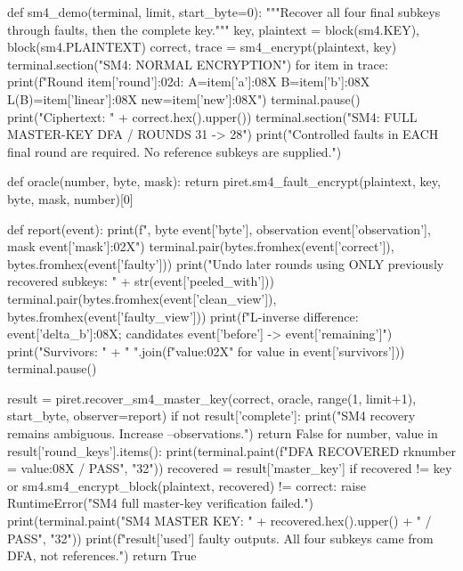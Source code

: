 \begin{lightcode}[numbers=left,firstnumber=1]
def sm4_demo(terminal, limit, start_byte=0):
    """Recover all four final subkeys through faults, then the complete key."""
    key, plaintext = block(sm4.KEY), block(sm4.PLAINTEXT)
    correct, trace = sm4_encrypt(plaintext, key)
    terminal.section("SM4: NORMAL ENCRYPTION")
    for item in trace:
        print(f"Round {item['round']:02d}: A={item['a']:08X} B={item['b']:08X} L(B)={item['linear']:08X} new={item['new']:08X}")
        terminal.pause()
    print("Ciphertext: " + correct.hex().upper())
    terminal.section("SM4: FULL MASTER-KEY DFA / ROUNDS 31 -> 28")
    print("Controlled faults in EACH final round are required. No reference subkeys are supplied.")

    def oracle(number, byte, mask):
        return piret.sm4_fault_encrypt(plaintext, key, byte, mask, number)[0]

    def report(event):
        print(f", byte {event['byte']}, observation {event['observation']}, mask {event['mask']:02X}")
        terminal.pair(bytes.fromhex(event['correct']), bytes.fromhex(event['faulty']))
        print("Undo later rounds using ONLY previously recovered subkeys: " + str(event['peeled_with']))
        terminal.pair(bytes.fromhex(event['clean_view']), bytes.fromhex(event['faulty_view']))
        print(f"L-inverse difference: {event['delta_b']:08X}; candidates {event['before']} -> {event['remaining']}")
        print("Survivors: " + " ".join(f"{value:02X}" for value in event['survivors']))
        terminal.pause()

    result = piret.recover_sm4_master_key(correct, oracle, range(1, limit+1), start_byte, observer=report)
    if not result['complete']:
        print("SM4 recovery remains ambiguous. Increase --observations.")
        return False
    for number, value in result['round_keys'].items():
        print(terminal.paint(f"DFA RECOVERED rk{number} = {value:08X} / PASS", "32"))
    recovered = result['master_key']
    if recovered != key or sm4.sm4_encrypt_block(plaintext, recovered) != correct:
        raise RuntimeError("SM4 full master-key verification failed.")
    print(terminal.paint("SM4 MASTER KEY: " + recovered.hex().upper() + " / PASS", "32"))
    print(f"{result['used']} faulty outputs. All four subkeys came from DFA, not references.")
    return True



\end{lightcode}
